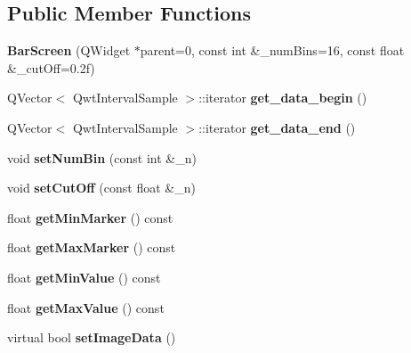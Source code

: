 \subsection*{Public Member Functions}
\begin{DoxyCompactItemize}
\item 
\mbox{\label{classBarScreen_a745463165da3716d2587f9bd15162be4}} 
{\bfseries Bar\+Screen} (Q\+Widget $\ast$parent=0, const int \&\+\_\+num\+Bins=16, const float \&\+\_\+cut\+Off=0.\+2f)
\item 
\mbox{\label{classBarScreen_a1950f3ff2fcb6f9c815480d79c41bcdd}} 
Q\+Vector$<$ Qwt\+Interval\+Sample $>$\+::iterator {\bfseries get\+\_\+data\+\_\+begin} ()
\item 
\mbox{\label{classBarScreen_a8b4c985476a91cfbaba65f9efb2fb98d}} 
Q\+Vector$<$ Qwt\+Interval\+Sample $>$\+::iterator {\bfseries get\+\_\+data\+\_\+end} ()
\item 
\mbox{\label{classBarScreen_aa39400dbc0e698031f526a5696c5f05e}} 
void {\bfseries set\+Num\+Bin} (const int \&\+\_\+n)
\item 
\mbox{\label{classBarScreen_a31a0a0513a3506fd31b4921d9ef9de5f}} 
void {\bfseries set\+Cut\+Off} (const float \&\+\_\+n)
\item 
\mbox{\label{classBarScreen_a3619df2d1013dcd882836654bdc7eca8}} 
float {\bfseries get\+Min\+Marker} () const
\item 
\mbox{\label{classBarScreen_a8c31c0657a9eae009fae26a6095527af}} 
float {\bfseries get\+Max\+Marker} () const
\item 
\mbox{\label{classBarScreen_a8b1fd79efa17f74f838604cf28e82497}} 
float {\bfseries get\+Min\+Value} () const
\item 
\mbox{\label{classBarScreen_a6621f8fa1c402d63dd9ac1a29002eb38}} 
float {\bfseries get\+Max\+Value} () const
\item 
\mbox{\label{classBarScreen_ab9e1489e0b5d95f26fd7a00763e91d11}} 
virtual bool {\bfseries set\+Image\+Data} ()

\end{DoxyCompactItemize}
